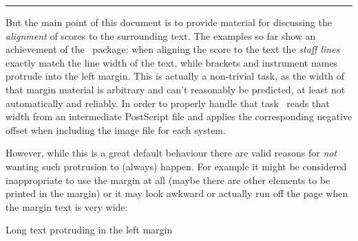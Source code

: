 \documentclass[DIV=12]{scrartcl}
\begin{document}
\bigskip
\hrule

\bigskip

But the main point of this document is to provide material for discussing the \emph{alignment} of scores to the surrounding text. The examples so far show an achievement of the \lyluatex\ package: when aligning the score to the text the \emph{staff lines} exactly match the line width of the text, while brackets and instrument names protrude into the left margin.  This is actually a non-trivial task, as the width of that margin material is arbitrary and can't reasonably be predicted, at least not automatically and reliably.  In order to properly handle that task \lyluatex\ reads that width from an intermediate PostScript file and applies the corresponding negative offset when including the image file for each system.

\setmainfont{Adobe Garamond Pro}

\bigskip
However, while this is a great default behaviour there are valid reasons for \emph{not} wanting such protrusion to (always) happen.  For example it might be considered inappropriate to use the margin at all (maybe there are other elements to be printed in the margin) or it may look awkward or  actually run off the page when the margin text is very wide:

\begin{musicExampleNonFloat}
\caption{Long text protruding in the left margin}
\end{musicExampleNonFloat}
\end{document}
